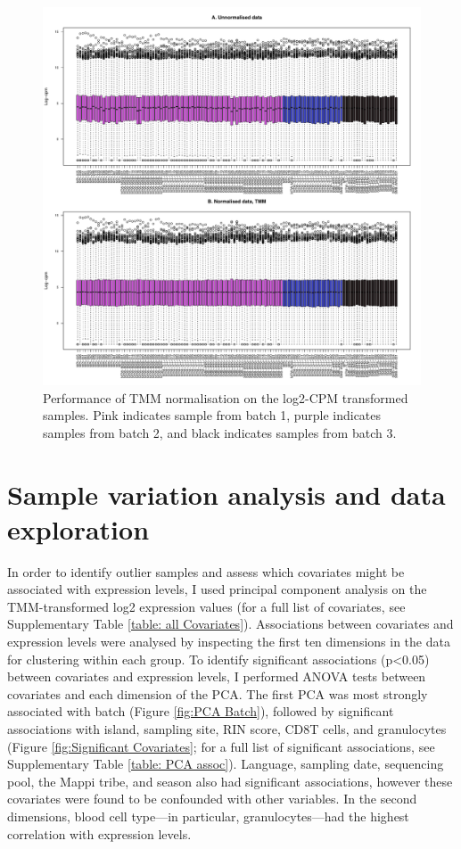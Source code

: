 \documentclass[12pt,a4paper,titlepage,twoside,openright]{book}
\begin{document}
\begin{mainmatter}
{\begin{figure}[htb!]
\centering
\includegraphics[width=\textwidth,height=\textheight,keepaspectratio]{Figures/NormalisedGeneExpressionDistribution_IndoRNA_TMM.pdf}
\caption{Performance of TMM normalisation on the log2-CPM transformed samples. Pink indicates sample from batch 1, purple indicates samples from batch 2, and black indicates samples from batch 3.}
\label{fig:TMM normalisation}
\end{figure}

\section{Sample variation analysis and data exploration}
In order to identify outlier samples and assess which covariates might be associated with expression levels, I used principal component analysis on the TMM-transformed log2 expression values (for a full list of covariates, see Supplementary Table \ref{table: all Covariates}). Associations between covariates and expression levels were analysed by inspecting the first ten dimensions in the data for clustering within each group. To identify significant associations (p<0.05) between covariates and expression levels, I performed ANOVA tests between covariates and each dimension of the PCA. The first PCA was most strongly associated with batch (﻿Figure \ref{fig:PCA Batch}), followed by significant associations with island, sampling site, RIN score, CD8T cells, and granulocytes (﻿Figure \ref{fig:Significant Covariates}; for a full list of significant associations, see Supplementary Table \ref{table: PCA assoc}). Language, sampling date, sequencing pool, the Mappi tribe, and season also had significant associations, however these covariates were found to be confounded with other variables. In the second dimensions, blood cell type—in particular, granulocytes—had the highest correlation with expression levels. 

}
\end{mainmatter}
\end{document}
